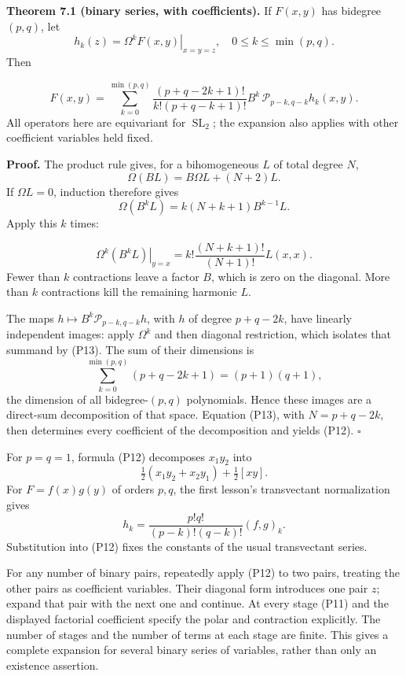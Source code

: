 \documentclass[
]{article}
\begin{document}
\protect{}\label{theorem-7-1}{}

\textbf{Theorem 7.1 (binary series, with coefficients).} If \(F(x,y)\)
has bidegree \((p,q)\), let \[
h_k(z)=\left.\Omega^kF(x,y)\right|_{x=y=z},
\quad 0\leq k\leq\min(p,q).
\] Then \protect{}\label{equation-P12}{}

\[
F(x,y)=\sum_{k=0}^{\min(p,q)}
\frac{(p+q-2k+1)!}{k!(p+q-k+1)!}
B^k\,\mathcal P_{p-k,q-k}h_k(x,y).
\tag{P12}
\] All operators here are equivariant for \(\operatorname{SL}_2\); the
expansion also applies with other coefficient variables held fixed.

\textbf{Proof.} The product rule gives, for a bihomogeneous \(L\) of
total degree \(N\), \[
\Omega(BL)=B\Omega L+(N+2)L.
\] If \(\Omega L=0\), induction therefore gives \[
\Omega(B^kL)=k(N+k+1)B^{k-1}L.
\] Apply this \(k\) times: \protect{}\label{equation-P13}{}

\[
\left.\Omega^k(B^kL)\right|_{y=x}
=k!\frac{(N+k+1)!}{(N+1)!}L(x,x).
\tag{P13}
\] Fewer than \(k\) contractions leave a factor \(B\), which is zero on
the diagonal. More than \(k\) contractions kill the remaining harmonic
\(L\).

The maps \(h\mapsto B^k\mathcal P_{p-k,q-k}h\), with \(h\) of degree
\(p+q-2k\), have linearly independent images: apply \(\Omega^k\) and
then diagonal restriction, which isolates that summand by (P13). The sum
of their dimensions is \[
\sum_{k=0}^{\min(p,q)}(p+q-2k+1)=(p+1)(q+1),
\] the dimension of all bidegree-\((p,q)\) polynomials. Hence these
images are a direct-sum decomposition of that space. Equation (P13),
with \(N=p+q-2k\), then determines every coefficient of the
decomposition and yields (P12). \(\square\)

For \(p=q=1\), formula (P12) decomposes \(x_1y_2\) into \[
\tfrac12(x_1y_2+x_2y_1)+\tfrac12 [xy].
\] For \(F=f(x)g(y)\) of orders \(p,q\), the first lesson's transvectant
normalization gives \[
h_k=\frac{p!q!}{(p-k)!(q-k)!}(f,g)_k.
\] Substitution into (P12) fixes the constants of the usual transvectant
series.

For any number of binary pairs, repeatedly apply (P12) to two pairs,
treating the other pairs as coefficient variables. Their diagonal form
introduces one pair \(z\); expand that pair with the next one and
continue. At every stage (P11) and the displayed factorial coefficient
specify the polar and contraction explicitly. The number of stages and
the number of terms at each stage are finite. This gives a complete
expansion for several binary series of variables, rather than only an
existence assertion.
\end{document}

